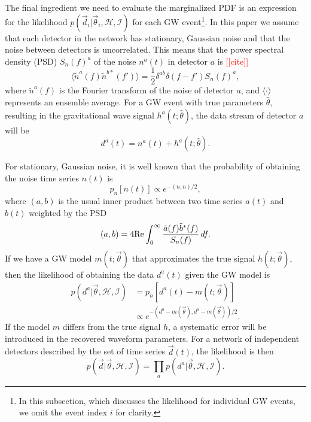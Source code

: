 \documentclass[twocolumn,prd,amssymb,aps,nofootinbib,showpacs,epsf]{revtex4}
\newcommand{\red}{\textcolor{red}}
\begin{document}
The final ingredient we need to evaluate the marginalized PDF is an expression for the likelihood $p(\vec d_i | \vec\theta_i,\mathcal{H},\mathcal{I})$ for each GW event\footnote{In this subsection, which discusses the likelihood for individual GW events, we omit the event index $i$ for clarity.}. In this paper we assume that each detector in the network has stationary, Gaussian noise and that the noise between detectors is uncorrelated. This means that the power spectral density (PSD) $S_n(f)^a$ of the noise $n^a(t)$ in detector $a$ is \red{[[cite]]}
\begin{equation}
\langle \tilde n^a(f) \tilde n^{b*}(f') \rangle = \frac{1}{2} \delta^{ab} \delta (f-f') S_n(f)^a,
\end{equation}
where $\tilde n^a(f)$ is the Fourier transform of the noise of detector $a$, and $\langle\cdot\rangle$ represents an ensemble average. For a GW event with true parameters $\hat\theta$, resulting in the gravitational wave signal $h^a(t; \hat\theta)$, the data stream of detector $a$ will be
\begin{equation}
d^a(t) = n^a(t) + h^a(t; \hat\theta).
\end{equation}

For stationary, Gaussian noise, it is well known that the probability of obtaining the noise time series $n(t)$ is
\begin{equation}
p_n[n(t)] \propto e^{-(n, n)/2},
\end{equation}
where $(a, b)$ is the usual inner product between two time series $a(t)$ and $b(t)$ weighted by the PSD
\begin{equation}
(a, b)=4{\rm Re} \int_0^\infty \frac{\tilde a(f) \tilde b^*(f)}{S_n(f)}\,df.
\end{equation}
If we have a GW model $m(t;\vec\theta)$ that approximates the true signal $h(t;\vec\theta)$, then the likelihood of obtaining the data $d^a(t)$ given the GW model is
\begin{align}
p(d^a | \vec\theta, \mathcal{H}, \mathcal{I}) &= p_n[d^a(t)-m(t; \vec\theta)] \nonumber\\
& \propto e^{-(d^a - m(\vec\theta), d^a - m(\vec\theta))/2}.
\end{align}
If the model $m$ differs from the true signal $h$, a systematic error will be introduced in the recovered waveform parameters. For a network of independent detectors described by the set of time series $\vec d(t)$, the likelihood is then
\begin{equation}
p(\vec d | \vec\theta, \mathcal{H}, \mathcal{I}) = \prod_a p(d^a | \vec\theta, \mathcal{H}, \mathcal{I}).
\end{equation}
\end{document}
